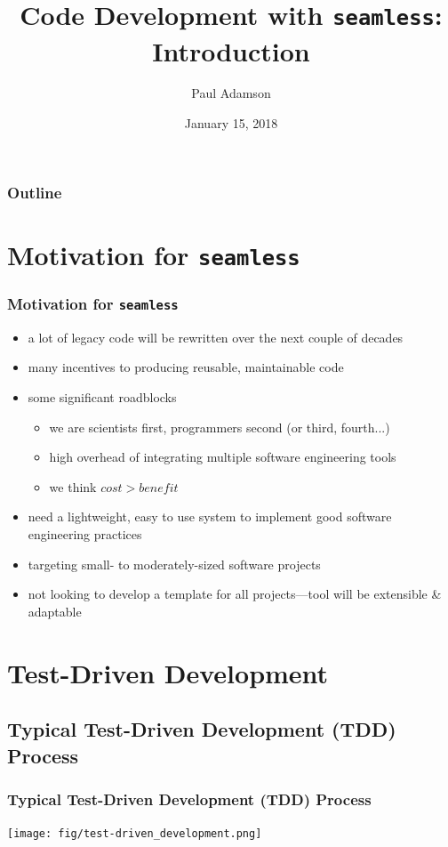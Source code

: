 \documentclass{beamer}
\title[\seamless Introduction]{Code Development with \texttt{seamless}: Introduction}
\author[Adamson]{Paul Adamson}
\date{January 15, 2018}
\makeatletter
\newcommand*{\seamless}{\texttt{seamless}\@\xspace}
\makeatother
\begin{document}
\begin{frame}
  \titlepage
\end{frame}

\begin{frame}
  \frametitle{Outline}
  \tableofcontents
\end{frame}

\section{Motivation for \texttt{seamless}}
\begin{frame}
  \frametitle{Motivation for \seamless}
  \begin{itemize}
    \item a lot of legacy code will be rewritten over the next couple of decades
    \item many incentives to producing reusable, maintainable code\cite{petre}
    \item some significant roadblocks 
      \begin{itemize}
        \item we are scientists first, programmers second (or third, fourth...)
        \item high overhead of integrating multiple software engineering tools
        \item we think $cost > benefit$
      \end{itemize}
    \item need a lightweight, easy to use system to implement good software engineering
      practices
    \item targeting small- to moderately-sized software projects
    \item not looking to develop a template for all projects---tool will be extensible \& adaptable
  \end{itemize}
\end{frame}


\section{Test-Driven Development}
\subsection{Typical Test-Driven Development (TDD) Process}
\begin{frame}
  \frametitle{Typical Test-Driven Development (TDD) Process\cite{tdd-wikipedia}}
  \texttt{[image: fig/test-driven\_development.png]}
\end{frame}
\end{document}
